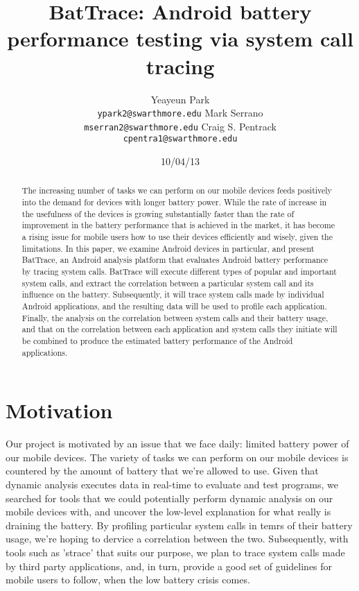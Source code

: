 \documentclass[11pt]{article}
\title{BatTrace: Android battery performance testing via system call tracing}
\author{Yeayeun Park\\
  {\tt ypark2@swarthmore.edu}  
  \And                           
  Mark Serrano\\
  {\tt mserran2@swarthmore.edu}
  \And                            
  Craig S. Pentrack\\                 
  {\tt cpentra1@swarthmore.edu}}
\date{10/04/13}
\begin{document}
\maketitle
\begin{abstract}
  The increasing number of tasks we can perform on our mobile devices 
  feeds positively into the demand for devices with longer battery power. 
  While the rate of increase in the usefulness of the devices is 
  growing substantially faster than the rate of improvement in the battery 
  performance that is achieved in the market, it has become a rising issue 
  for mobile users how to use their devices efficiently and wisely, given 
  the limitations. In this paper, we examine Android devices in particular, 
  and present BatTrace, an Android analysis platform that evaluates Android 
  battery performance by tracing system calls. BatTrace will execute 
  different types of popular and important system calls, and extract the 
  correlation between a particular system call and its influence on the 
  battery. Subsequently, it will trace system calls made by individual Android 
  applications, and the resulting data will be used to profile each application. 
  Finally, the analysis on the correlation between system calls and their 
  battery usage, and that on the correlation between each application and system 
  calls they initiate will be combined to produce the estimated battery performance 
  of the Android applications.
\end{abstract}

\section{Motivation}

Our project is motivated by an issue that we face daily: limited battery power 
of our mobile devices. The variety of tasks we can perform on our mobile
devices is countered by the amount of battery that we're allowed to use. Given 
that dynamic analysis executes data in real-time to evaluate and test programs, 
we searched for tools that we could potentially perform dynamic analysis on our 
mobile devices with, and uncover the low-level explanation for what really is 
draining the battery. By profiling particular system calls in temrs of their battery
usage, we're hoping to dervice a correlation between the two. Subsequently, with tools 
such as 'strace' that suits our purpose, we plan to trace system calls made by third 
party applications, and, in turn, provide a good set of guidelines for mobile users 
to follow, when the low battery crisis comes.
\end{document}

